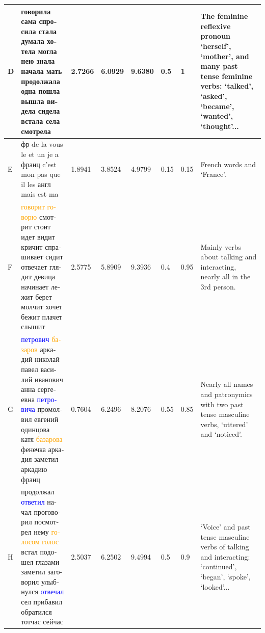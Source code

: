 \documentclass[11pt,a4paper]{article}
\begin{document}
\begin{landscape}
\begin{center}
\begin{tabularx}{\textwidth}{|l|X|l|l|l|l|l|X|}
    D & \foreignlanguage{russian}{говорила сама спросила стала думала хотела могла нею знала начала мать продолжала одна пошла вышла видела сидела встала села смотрела} & 2.7266 & 6.0929 & 9.6380 &  0.5 & 1 & The feminine reflexive pronoun `herself', `mother', and many past tense feminine verbs: `talked', `asked', `became', `wanted', `thought'...\\ \hline
    E & \foreignlanguage{russian}{фр de la vous le et un je a франц c'est mon pas que il les англ mais est ma} & 1.8941 & 3.8524 & 4.9799 & 0.15 & 0.15 & French words and `France'. \\ \hline
    F & \foreignlanguage{russian}{\textcolor{orange}{говорит говорю} смотрит стоит идет видит кричит спрашивает сидит отвечает глядит девица начинает лежит берет молчит хочет бежит плачет слышит} & 2.5775 & 5.8909 & 9.3936 & 0.4 & 0.95 & Mainly verbs about talking and interacting, nearly all in the 3rd person. \\ \hline
    G & \foreignlanguage{russian}{\textcolor{blue}{петрович} \textcolor{orange}{базаров} аркадий николай павел василий иванович анна сергеевна \textcolor{blue}{петровича} промолвил евгений одинцова катя \textcolor{orange}{базарова} фенечка аркадия заметил аркадию франц} & 0.7604 & 6.2496 & 8.2076 & 0.55 & 0.85 & Nearly all names and patronymics with two past tense masculine verbs, `uttered' and `noticed'. \\ \hline
    H & \foreignlanguage{russian}{продолжал \textcolor{blue}{ответил} начал проговорил посмотрел нему \textcolor{orange}{голосом голос} встал подошел глазами заметил заговорил улыбнулся \textcolor{blue}{отвечал} сел прибавил обратился тотчас сейчас} & 2.5037 & 6.2502 & 9.4994 & 0.5 & 0.9 & `Voice' and past tense masculine verbs of talking and interacting: `continued', `began', `spoke', `looked'... \\ \hline
    \end{tabularx}


\end{center}
\end{landscape}
\end{document}
